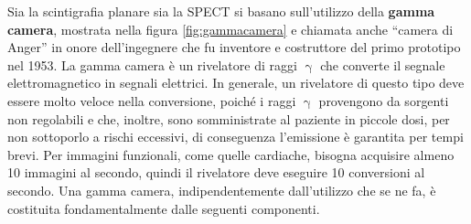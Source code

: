\documentclass{report}
\newcommand{\virgolette}[1]{``#1''}
\newcommand{\figref}[1]{figura \ref{#1}}
\numberwithin{equation}{section}
\numberwithin{figure}{section}
\begin{document}
\noindent Sia la scintigrafia planare sia la SPECT si basano sull'utilizzo della \textbf{gamma camera}, mostrata nella \figref{fig:gammacamera} e chiamata anche \virgolette{camera di Anger} in onore dell'ingegnere che fu inventore e costruttore del primo prototipo nel 1953. La gamma camera è un rivelatore di raggi $\upgamma$ che converte il segnale elettromagnetico in segnali elettrici. In generale, un rivelatore di questo tipo deve essere molto veloce nella conversione, poiché i raggi $\upgamma$ provengono da sorgenti non regolabili e che, inoltre, sono somministrate al paziente in piccole dosi, per non sottoporlo a rischi eccessivi, di conseguenza l'emissione è garantita per tempi brevi. Per immagini funzionali, come quelle cardiache, bisogna acquisire almeno 10 immagini al secondo, quindi il rivelatore deve eseguire 10 conversioni al secondo. Una gamma camera, indipendentemente dall'utilizzo che se ne fa, è costituita fondamentalmente dalle seguenti componenti.
\end{document}
